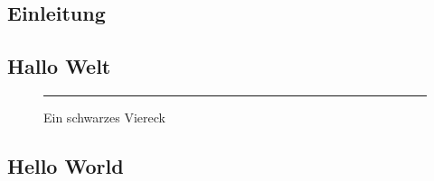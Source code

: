 
\begin{refsection}
\chapter{Einleitung}

\section{Hallo Welt}

\cite{Bulanov2012}

\begin{figure}[h]\centering
\rule{6cm}{4cm}
\caption{Ein schwarzes Viereck}
\end{figure}

\blindtext[10]

\section{Hello World}

\blindtext[10]

 \printbibliography
 \end{refsection}

